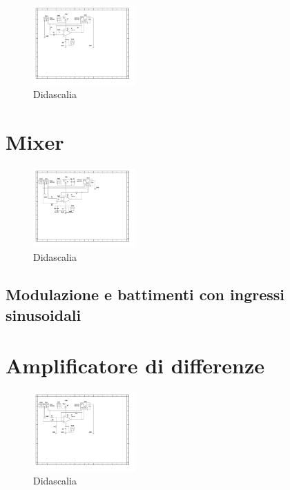 \documentclass[journal]{IEEEtran}
\begin{document}
\begin{figure}[H]%
\begin {center}
\includegraphics[width=0.35\textwidth]{sch-simulations/output/OPA-deriv.pdf}
\caption{Didascalia}
\label{fig:oscilloscope}
\end {center}
\end{figure}


\section{Mixer} %

\begin{figure}[H]%
\begin {center}
\includegraphics[width=0.35\textwidth]{sch-simulations/output/OPA-mixer.pdf}
\caption{Didascalia}
\label{fig:oscilloscope}
\end {center}
\end{figure}

\subsection{Modulazione e battimenti con ingressi sinusoidali}


\section{Amplificatore di differenze} %
\begin{figure}[H]%
\begin {center}
\includegraphics[width=0.35\textwidth]{sch-simulations/output/OPA-difference-amp.pdf}
\caption{Didascalia}
\label{fig:oscilloscope}
\end {center}
\end{figure}
\end{document}
